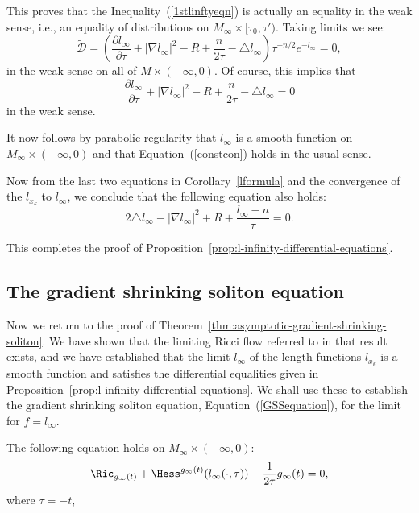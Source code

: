 This proves that the Inequality~(\ref{1stlinftyeqn}) is actually an
equality in the weak sense, i.e., an equality of distributions on
$M_\infty\times [\tau_0,\tau')$. Taking limits we see:
\begin{equation}\label{constcon}
\widetilde{\mathcal D}=\left(\frac{\partial l_\infty}{\partial
\tau}+|\nabla l_\infty|^2-R+\frac{n}{2\tau}-\triangle
l_\infty\right)\tau^{-n/2}e^{-l_\infty}=0,\end{equation} in the weak
sense on all of $M\times(-\infty,0)$. Of course, this implies that
$$\frac{\partial l_\infty}{\partial \tau}+|\nabla
l_\infty|^2-R+\frac{n}{2\tau}-\triangle l_\infty=0$$ in the weak
sense.


It now follows by parabolic regularity that $l_\infty$ is a smooth
function on $M_\infty\times(-\infty,0)$ and that
Equation~(\ref{constcon}) holds in the usual sense.


Now from the last two equations in Corollary~\ref{lformula} and the
convergence of the $l_{x_k}$ to $l_\infty$, we conclude that the
following equation also holds:
\begin{equation}\label{wk=}2\triangle l_\infty-|\nabla
l_\infty|^2+R+\frac{l_\infty-n}{\tau}=0.\end{equation}

This completes the proof of Proposition~\ref{prop:l-infinity-differential-equations}.

\subsection{The gradient shrinking soliton equation}

Now we return to the proof of Theorem~\ref{thm:asymptotic-gradient-shrinking-soliton}. We have shown that the
limiting Ricci flow   referred to in that result exists, and we have
established that the limit $l_\infty$ of the length functions $l_{x_k}$ is a
smooth function and satisfies the differential equalities given in
Proposition~\ref{prop:l-infinity-differential-equations}. We shall use these to establish the gradient
shrinking soliton equation,
Equation~(\ref{GSSequation}), for the limit for $f=l_\infty$.

\begin{proposition}\label{prop:limit-gradient-shrinking-soliton-equation}
\label{gradshrink}
The following equation holds on $M_\infty\times (-\infty,0)$:
$$ \Ric_{g_{\infty}(t)} + \Hess^{g_\infty(t)}(l_\infty(\cdot,\tau))
-\frac{1}{2\tau}g_{\infty}(t) = 0,$$ where $\tau=-t$,
\end{proposition}

